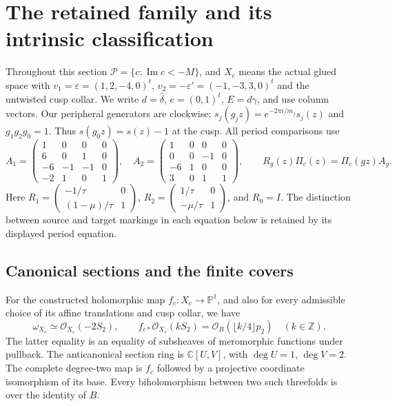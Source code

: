 \section{The retained family and its intrinsic classification}\label{fam:section:A}

Throughout this section $\mathcal P=\{c:\operatorname{Im}c<-M\}$, and $X_c$ means the actual glued space with $v_1=\varepsilon=(1,2,-4,0)^t$, $v_2=-\varepsilon'=(-1,-3,3,0)^t$ and the untwisted cusp collar. We write $d=\widehat\delta$, $e=(0,1)^t$, $E=d\gamma$, and use column vectors. Our peripheral generators are clockwise: $s_j(g_jz)=e^{-2\pi i/m_j}s_j(z)$ and $g_1g_2g_0=1$. Thus $s(g_0z)=s(z)-1$ at the cusp. All period comparisons use
\[
 A_1=\begin{pmatrix}1&0&0&0\\6&0&1&0\\-6&-1&-1&0\\-2&1&0&1\end{pmatrix},\quad
 A_2=\begin{pmatrix}1&0&0&0\\0&0&-1&0\\-6&1&0&0\\3&0&1&1\end{pmatrix},\qquad
 R_g(z)\Pi_c(z)=\Pi_c(gz)A_g.
\]
Here $R_1=\left(\begin{smallmatrix}-1/\tau&0\\(1-\mu)/\tau&1\end{smallmatrix}\right)$, $R_2=\left(\begin{smallmatrix}1/\tau&0\\-\mu/\tau&1\end{smallmatrix}\right)$, and $R_0=I$. The distinction between source and target markings in each equation below is retained by its displayed period equation.

\subsection{Canonical sections and the finite covers}\label{fam:section:A.1}

\begin{proposition}\label{fam:src:A.1.1}\label{fam:st:A.1.1}
For the constructed holomorphic map $f_c:X_c\to\mathbb P^1$, and also for every admissible choice of its affine translations and cusp collar, we have
\[
 \omega_{X_c}\simeq\mathcal O_{X_c}(-2S_2),\qquad
 f_{c*}\mathcal O_{X_c}(kS_2)=\mathcal O_B(\lfloor k/4\rfloor p_2)\quad(k\in\mathbb Z).
\]
The latter equality is an equality of subsheaves of meromorphic functions under pullback. The anticanonical section ring is $\mathbb C[U,V]$, with $\deg U=1$, $\deg V=2$. The complete degree-two map is $f_c$ followed by a projective coordinate isomorphism of its base. Every biholomorphism between two such threefolds is over the identity of $B$.
\end{proposition}


